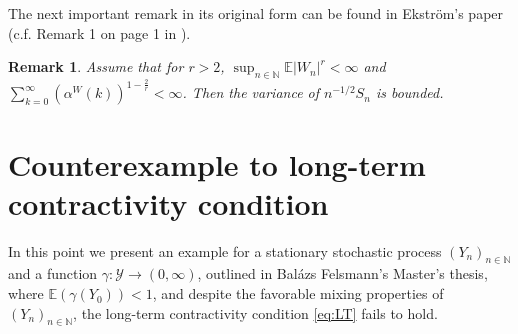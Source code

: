 \documentclass[a4paper,10pt]{article}
\newtheorem{remark}[theorem]{Remark}
\newcommand{\N}{\mathbb{N}}
\newcommand{\Y}{\mathcal{Y}}
\newcommand{\E}{\mathbb{E}}
\newcommand{\ga}{\gamma}
\begin{document}
The next important remark in its original form can be found in Ekstr\"om's paper (c.f. Remark 1 on page 1 in \cite{ekstrom2014general}).
\begin{remark}\label{rem:ekstromremark}
	Assume that for $r>2$, $\sup_{n\in\N}\E |W_n|^{r}<\infty$ and $\sum_{k=0}^{\infty} \left(\alpha^{W} (k)\right)^{1-\frac{2}{r}}<\infty$. Then the variance of $n^{-1/2}S_n$ is bounded. 
\end{remark}



\section{Counterexample to long-term contractivity condition}\label{ap:Felsmann}

In this point we present an example for a stationary stochastic process $(Y_n)_{n\in\N}$ and a function $\ga:\Y\to (0,\infty)$, outlined in Balázs Felsmann's Master's thesis, where $\E (\ga (Y_0))<1$, and despite the favorable mixing properties of $(Y_n)_{n\in\N}$, the long-term contractivity condition \eqref{eq:LT} fails to hold.
\end{document}
